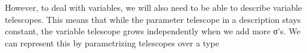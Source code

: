 However, to deal with variables, we will also need to be able to describe variable telescopes. This means that while the parameter telescope in a description stays constant, the variable telescope grows independently when we add more σ's. We can represent this by parametrizing telescopes over a type
\begin{code}[hide]%
\>[0]\AgdaSpace{}%
\AgdaSpace{}%
\<%
\\
\>[0][@{}l@{\AgdaIndent{0}}]%
\>[2]\AgdaSpace{}%
\<%
\\
\>[2][@{}l@{\AgdaIndent{0}}]%
\>[4]\AgdaSpace{}%
\AgdaSymbol{:}\AgdaSpace{}%
\<%
\\
%
\>[4]\AgdaSpace{}%
\AgdaSymbol{:}\AgdaSpace{}%
\<%
\end{code}
